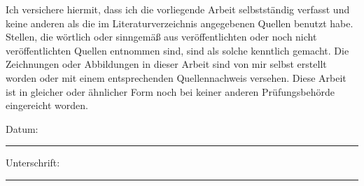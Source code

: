 \documentclass[
11pt, %
oneside, %
ngerman, %
singlespacing, %
headsepline, %
]{MasterThesis} %
\author{Dany \textsc{Brossel}} %
\begin{document}
\frontmatter %

\pagestyle{plain} %




\begin{titlepage}

\end{titlepage}


\begin{declaration}
\vspace*{.04\textheight}
\noindent Ich versichere hiermit, dass ich die vorliegende Arbeit selbstständig verfasst und keine anderen als
die im Literaturverzeichnis angegebenen Quellen benutzt habe.\newline\newline
Stellen, die wörtlich oder sinngemäß aus veröffentlichten oder noch nicht veröffentlichten Quellen
entnommen sind, sind als solche kenntlich gemacht.\newline\newline
Die Zeichnungen oder Abbildungen in dieser Arbeit sind von mir selbst erstellt worden oder mit
einem entsprechenden Quellennachweis versehen.\newline\newline
Diese Arbeit ist in gleicher oder ähnlicher Form noch bei keiner anderen Prüfungsbehörde eingereicht
worden.\newline\newline\newline

\noindent Datum:\\
\rule[0.5em]{25em}{0.5pt} %


\noindent Unterschrift:\\
\rule[0.5em]{25em}{0.5pt} %
 
\end{declaration}

\cleardoublepage
\end{document}
